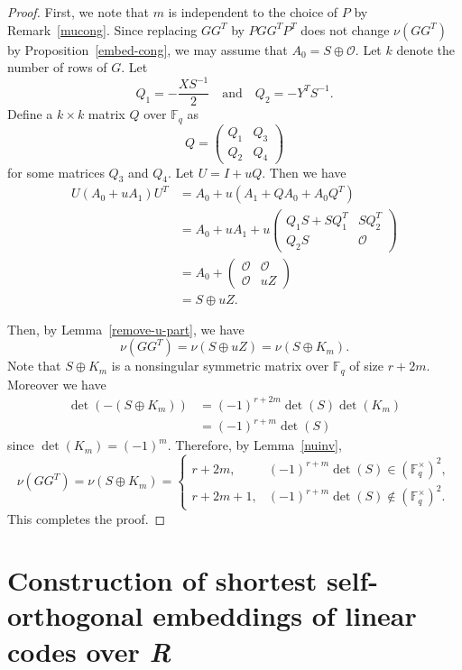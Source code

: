 \documentclass{article}
\theoremstyle{definition}
\theoremstyle{remark}
\begin{document}
\begin{proof}
First, we note that $m$ is independent to the choice of $P$ by Remark~\ref{mucong}. Since replacing $GG^T$ by $PGG^TP^T$ does not change $\nu(GG^T)$ by Proposition~\ref{embed-cong}, we may assume that $A_0=S\oplus \mathcal{O}$. Let $k$ denote the number of rows of $G$. Let
\[
Q_1=-\frac{XS^{-1}}{2}\quad\mbox{and}\quad Q_2=-Y^TS^{-1}.
\]
Define a $k\times k$ matrix $Q$ over $\mathbb{F}_q$ as
\[
Q=\begin{pmatrix}
    Q_1 & Q_3\\Q_2 & Q_4
\end{pmatrix}
\]
for some matrices $Q_3$ and $Q_4$. Let $U=I+uQ$. Then we have
\begin{align*}
U(A_0+uA_1)U^T&=A_0+u(A_1+QA_0+A_0Q^T)\\
&=A_0+uA_1+u\begin{pmatrix}
        Q_1S+SQ_1^T & SQ_2^T\\Q_2S & \mathcal{O}
    \end{pmatrix}\\
    &=A_0+\begin{pmatrix}
        \mathcal{O} & \mathcal{O}\\\mathcal{O} & uZ
    \end{pmatrix}\\&=S\oplus uZ.
\end{align*}

Then, by Lemma~\ref{remove-u-part}, we have
\[
\nu(GG^T)=\nu(S\oplus uZ)=\nu(S\oplus K_m).
\]
Note that $S\oplus K_m$ is a nonsingular symmetric matrix over $\mathbb{F}_q$ of size $r+2m$. Moreover we have
\begin{align*}
\det(-(S\oplus K_m))&=(-1)^{r+2m}\det (S)\det(K_m)\\&=(-1)^{r+m}\det(S)
\end{align*}
since $\det(K_m)=(-1)^m$. Therefore, by Lemma~\ref{nuinv}, 
\[
\nu(GG^T)=\nu(S\oplus K_m)=\begin{cases}
        r+2m, &(-1)^{r+m}\det(S)\in (\mathbb{F}_q^\times)^2,\\
        r+2m+1, & (-1)^{r+m}\det(S)\notin (\mathbb{F}_q^\times)^2.
    \end{cases}
\]
This completes the proof.
\end{proof}

\section{Construction of shortest self-orthogonal embeddings of linear codes over {\it R}}
\end{document}
